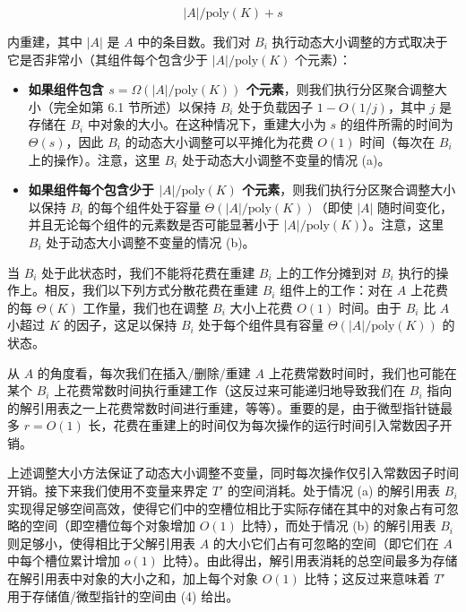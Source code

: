 \documentclass[12pt,a4paper]{ctexart}
\theoremstyle{remark}
\begin{document}
$$|A|/\text{poly}(K)+s$$

内重建，其中 $|A|$ 是 $A$ 中的条目数。我们对 $B_i$ 执行动态大小调整的方式取决于它是否非常小（其组件每个包含少于 $|A|/\text{poly}(K)$ 个元素）：

\begin{itemize}
\item \textbf{如果组件包含 $s=\Omega(|A|/\text{poly}(K))$ 个元素}，则我们执行分区聚合调整大小（完全如第 6.1 节所述）以保持 $B_i$ 处于负载因子 $1-O(1/j)$，其中 $j$ 是存储在 $B_i$ 中对象的大小。在这种情况下，重建大小为 $s$ 的组件所需的时间为 $\Theta(s)$，因此 $B_i$ 的动态大小调整可以平摊化为花费 $O(1)$ 时间（每次在 $B_i$ 上的操作）。注意，这里 $B_i$ 处于动态大小调整不变量的情况 (a)。
\end{itemize}

\begin{itemize}
\item \textbf{如果组件每个包含少于 $|A|/\text{poly}(K)$ 个元素}，则我们执行分区聚合调整大小以保持 $B_i$ 的每个组件处于容量 $\Theta(|A|/\text{poly}(K))$（即使 $|A|$ 随时间变化，并且无论每个组件的元素数是否可能显著小于 $|A|/\text{poly}(K)$）。注意，这里 $B_i$ 处于动态大小调整不变量的情况 (b)。
\end{itemize}

  当 $B_i$ 处于此状态时，我们不能将花费在重建 $B_i$ 上的工作分摊到对 $B_i$ 执行的操作上。相反，我们以下列方式分散花费在重建 $B_i$ 组件上的工作：对在 $A$ 上花费的每 $\Theta(K)$ 工作量，我们也在调整 $B_i$ 大小上花费 $O(1)$ 时间。由于 $B_i$ 比 $A$ 小超过 $K$ 的因子，这足以保持 $B_i$ 处于每个组件具有容量 $\Theta(|A|/\text{poly}(K))$ 的状态。

  从 $A$ 的角度看，每次我们在插入/删除/重建 $A$ 上花费常数时间时，我们也可能在某个 $B_i$ 上花费常数时间执行重建工作（这反过来可能递归地导致我们在 $B_i$ 指向的解引用表之一上花费常数时间进行重建，等等）。重要的是，由于微型指针链最多 $r=O(1)$ 长，花费在重建上的时间仅为每次操作的运行时间引入常数因子开销。

上述调整大小方法保证了动态大小调整不变量，同时每次操作仅引入常数因子时间开销。接下来我们使用不变量来界定 $T'$ 的空间消耗。处于情况 (a) 的解引用表 $B_i$ 实现得足够空间高效，使得它们中的空槽位相比于实际存储在其中的对象占有可忽略的空间（即空槽位每个对象增加 $O(1)$ 比特），而处于情况 (b) 的解引用表 $B_i$ 则足够小，使得相比于父解引用表 $A$ 的大小它们占有可忽略的空间（即它们在 $A$ 中每个槽位累计增加 $o(1)$ 比特）。由此得出，解引用表消耗的总空间最多为存储在解引用表中对象的大小之和，加上每个对象 $O(1)$ 比特；这反过来意味着 $T'$ 用于存储值/微型指针的空间由 (4) 给出。
\end{document}
